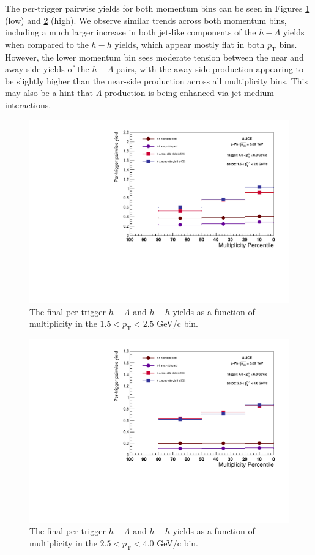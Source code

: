 \documentclass[ALICE,manyauthors]{ALICE_analysis_notes}
\begin{document}
 The per-trigger pairwise yields for both momentum bins can be seen in Figures \ref{low_momentum_yield} (low) and \ref{high_momentum_yield} (high). We observe similar trends across both momentum bins, including a much larger increase in both jet-like components of the $h-\Lambda$ yields when compared to the $h-h$ yields, which appear mostly flat in both $p_\text{T}$ bins. However, the lower momentum bin sees moderate tension between the near and away-side yields of the $h-\Lambda$ pairs, with the away-side production appearing to be slightly higher than the near-side production across all multiplicity bins. This may also be a hint that $\Lambda$ production is being enhanced via jet-medium interactions.

\begin{figure}[ht]
\centering
\includegraphics[width=5in]{figures/per_trigger_yields_15_25.pdf}
\caption{The final per-trigger $h-\Lambda$ and $h-h$ yields as a function of multiplicity in the $1.5 < p_{\text{T}} < 2.5$ GeV/c bin.}
\label{low_momentum_yield}
\end{figure}

\begin{figure}[ht]
\centering
\includegraphics[width=5in]{figures/per_trigger_yields_25_40.pdf}
\caption{The final per-trigger $h-\Lambda$ and $h-h$ yields as a function of multiplicity in the $2.5 < p_{\text{T}} < 4.0$ GeV/c bin.}
\label{high_momentum_yield}
\end{figure}
\end{document}
